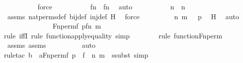 \begin{isabellebody}
\ \ \ \ \ \ \ \ \isamarkupfalse%
\ force\ \isanewline
\ \ \ \ \ \ \isamarkupfalse%
\ \isamarkupfalse%
\ {\isachardoublequoteopen}f{\isacharbackquote}{\kern0pt}n\ {\isacharequal}{\kern0pt}\ f{\isacharbackquote}{\kern0pt}n{\isacharprime}{\kern0pt}{\isachardoublequoteclose}\ \isamarkupfalse%
\ auto\ \isanewline
\ \ \ \ \ \ \isamarkupfalse%
\ \isamarkupfalse%
\ {\isachardoublequoteopen}n\ {\isacharequal}{\kern0pt}\ n{\isacharprime}{\kern0pt}{\isachardoublequoteclose}\ \isamarkupfalse%
\ assms\ nat{\isacharunderscore}{\kern0pt}perms{\isacharunderscore}{\kern0pt}def\ bij{\isacharunderscore}{\kern0pt}def\ inj{\isacharunderscore}{\kern0pt}def\ H\ \isamarkupfalse%
\ force\isanewline
\ \ \ \ \ \ \isamarkupfalse%
\ \isamarkupfalse%
\ {\isachardoublequoteopen}{\isasymlangle}{\isasymlangle}n{\isacharcomma}{\kern0pt}\ m{\isasymrangle}{\isacharcomma}{\kern0pt}\ {}{\isasymrangle}\ {\isasymin}\ p{\isachardoublequoteclose}\ \isamarkupfalse%
\ H\ \isamarkupfalse%
\ auto\isanewline
\ \ \ \ \isamarkupfalse%
\isanewline
\ \ \ \ \isamarkupfalse%
\ \isamarkupfalse%
\ {\isachardoublequoteopen}{\isachardot}{\kern0pt}{\isachardot}{\kern0pt}{\isachardot}{\kern0pt}\ {\isasymlongleftrightarrow}\ Fn{\isacharunderscore}{\kern0pt}perm{\isacharparenleft}{\kern0pt}f{\isacharcomma}{\kern0pt}\ p{\isacharparenright}{\kern0pt}{\isacharbackquote}{\kern0pt}{\isacharless}{\kern0pt}f{\isacharbackquote}{\kern0pt}n{\isacharcomma}{\kern0pt}\ m{\isachargreater}{\kern0pt}\ {\isacharequal}{\kern0pt}\ {}{\isachardoublequoteclose}\ \isanewline
\ \ \ \ \ \ \isamarkupfalse%
{\isacharparenleft}{\kern0pt}rule\ iffI{\isacharcomma}{\kern0pt}\ rule\ function{\isacharunderscore}{\kern0pt}apply{\isacharunderscore}{\kern0pt}equality{\isacharcomma}{\kern0pt}\ simp{\isacharparenright}{\kern0pt}\isanewline
\ \ \ \ \ \ \ \isamarkupfalse%
{\isacharparenleft}{\kern0pt}rule\ function{\isacharunderscore}{\kern0pt}Fn{\isacharunderscore}{\kern0pt}perm{\isacharparenright}{\kern0pt}\isanewline
\ \ \ \ \ \ \isamarkupfalse%
\ assms{}\ assms\isanewline
\ \ \ \ \ \ \ \ \isamarkupfalse%
\ auto{\isacharbrackleft}{\kern0pt}{}{\isacharbrackright}{\kern0pt}\isanewline
\ \ \ \ \ \ \isamarkupfalse%
{\isacharparenleft}{\kern0pt}rule{\isacharunderscore}{\kern0pt}tac\ b{\isacharequal}{\kern0pt}{}\ \ a{\isacharequal}{\kern0pt}{\isachardoublequoteopen}Fn{\isacharunderscore}{\kern0pt}perm{\isacharparenleft}{\kern0pt}f{\isacharcomma}{\kern0pt}\ p{\isacharparenright}{\kern0pt}\ {\isacharbackquote}{\kern0pt}\ {\isasymlangle}f\ {\isacharbackquote}{\kern0pt}\ n{\isacharcomma}{\kern0pt}\ m{\isasymrangle}{\isachardoublequoteclose}\ \ ssubst{\isacharcomma}{\kern0pt}\ simp{\isacharparenright}{\kern0pt}\isanewline

\end{isabellebody}

